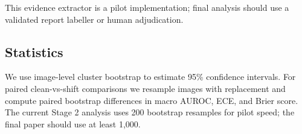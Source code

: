 This evidence extractor is a pilot implementation; final analysis should use a validated report labeller or human adjudication.

\subsection{Statistics}

We use image-level cluster bootstrap to estimate 95\% confidence intervals. For paired clean-vs-shift comparisons we resample images with replacement and compute paired bootstrap differences in macro AUROC, ECE, and Brier score. The current Stage 2 analysis uses 200 bootstrap resamples for pilot speed; the final paper should use at least 1,000.

